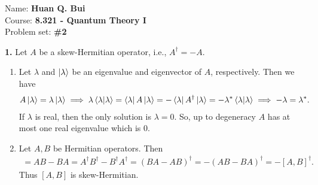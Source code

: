 \documentclass{article}
\theoremstyle{definition}
\begin{document}
\begin{framed}
\noindent Name: \textbf{Huan Q. Bui}\\
Course: \textbf{8.321 - Quantum Theory I}\\
Problem set: \textbf{\#2}
\end{framed}
	


\noindent \textbf{1.} Let $A$ be a skew-Hermitian operator, i.e., $A^\dagger = -A$.
\begin{enumerate}[label=(\alph*)]
	\item Let $\lambda$ and $\ket{\lambda}$ be an eigenvalue and eigenvector of $A$, respectively. Then we have
	\begin{align*}
	A\ket{\lambda} = \lambda\ket{\lambda} \implies \lambda\braket{\lambda} = \bra{\lambda}A\ket{\lambda} = -\bra{\lambda}A^\dagger\ket{\lambda}  = -\lambda^* \braket{\lambda} \implies -\lambda = \lambda^*.
	\end{align*} 
	If $\lambda$ is real, then the only solution is $\lambda = 0$. So, up to degeneracy $A$ has at most one real eigenvalue which is $0$. 
	
	  
	
	\item  Let $A,B$ be Hermitian operators. Then
	\begin{align*}
	[A,B] = AB - BA = A^\dagger B^\dagger - B^\dagger A^\dagger = (BA - AB)^\dagger = -(AB-BA)^\dagger = -[A,B]^\dagger.
	\end{align*}
	Thus $[A,B]$ is skew-Hermitian. 
\end{enumerate}
\end{document}
